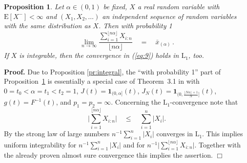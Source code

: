 \documentclass[11pt,a4paper,leqno]{article}
\newtheorem{proposition}[theorem]{Proposition}
\begin{document}
\begin{proposition} \label{pr:limit}
Let $\alpha \in (0,1)$ be fixed, $X$ a real random variable with $\mathrm{E}[X^-] < \infty$ and $(X_1, X_2, \ldots)$ an
independent sequence of random variables with the same distribution as $X$.  Then
with probability 1
\begin{equation}
\lim_{n\to\infty} \frac{\sum\limits_{i=1}^{\lfloor n \alpha \rfloor} X_{i:n}}{\lfloor n \alpha \rfloor}
\quad  = \quad  \bar{x}_{(\alpha)}\,.
  \label{eq:9}
\end{equation}
If $X$ is integrable, then the convergence in (\ref{eq:9}) holds  in $\mathrm{L}_1$, too.
\end{proposition}
%
\textbf{Proof.} Due to Proposition \ref{pr:integral}, the ``with probability 1'' part of 
Proposition~\ref{pr:limit} 
is essentially a special case of Theorem~3.1 in \cite{vZwet80} with
$0 = t_0 < \alpha = t_1 < t_2 = 1$, $J(t) = \mathbf{1}_{(0, \alpha]}(t)$, 
$J_N(t) = \mathbf{1}_{(0, \frac{\lfloor N \alpha\rfloor + 1}N]}(t)$, $g(t) = 
F^{-1}(t)$,
and $p_1 = p_2 = \infty$. Concerning the $\mathrm{L}_1$-convergence note that
$$
\bigl| \sum\limits_{i=1}^{\lfloor n \alpha \rfloor} X_{i:n}\bigr| \quad \le \quad
\sum\limits_{i=1}^n |X_i|.
$$
By the strong law of large numbers $n^{-1} \sum_{i=1}^n |X_i|$ converges in $\mathrm{L}_1$.
This implies uniform integrability for $n^{-1} \sum_{i=1}^n |X_i|$ and for
$n^{-1} \bigl| \sum_{i=1}^{\lfloor n \alpha \rfloor} X_{i:n}\bigr|$. Together with the already
proven almost sure convergence this implies the assertion.
\hfill $\Box$
\end{document}
